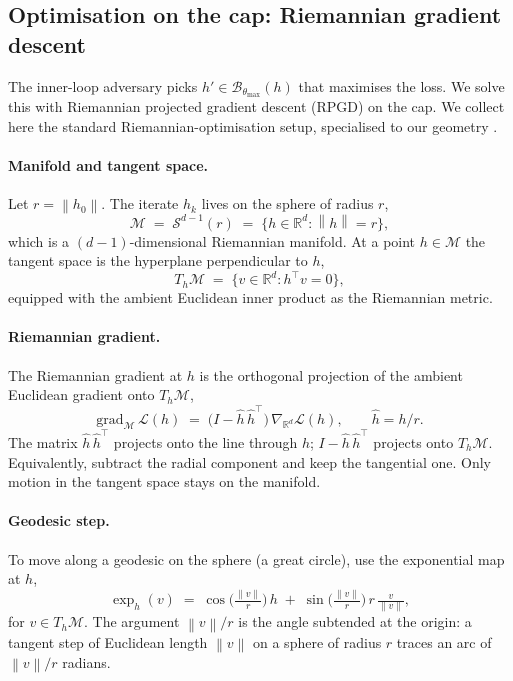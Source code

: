 \documentclass[11pt]{article}
\newcommand{\R}{\mathbb{R}}
\newcommand{\hh}{\hat h}
\newcommand{\thmax}{\theta_{\max}}
\newcommand{\norm}[1]{\left\lVert#1\right\rVert}
\begin{document}
\subsection{Optimisation on the cap: Riemannian gradient descent}\label{sec:projection}

The inner-loop adversary picks $h' \in \mathcal{B}_{\thmax}(h)$ that maximises the loss. We solve this with Riemannian projected gradient descent (RPGD) on the cap. We collect here the standard Riemannian-optimisation setup, specialised to our geometry \citet{bonnabel2013stochastic, tripuraneni2018averaging, boumal2023introduction}.


\paragraph{Manifold and tangent space.} Let $r = \norm{h_0}$. The iterate $h_k$ lives on the sphere of radius $r$,
\begin{equation*}
\mathcal{M} \;=\; \mathcal{S}^{d-1}(r) \;=\; \{ h \in \R^d : \norm{h} = r \},
\end{equation*}
which is a $(d-1)$-dimensional Riemannian manifold. At a point $h \in \mathcal{M}$ the tangent space is the hyperplane perpendicular to $h$,
\begin{equation*}
T_h \mathcal{M} \;=\; \{ v \in \R^d : h^\top v = 0 \},
\end{equation*}
equipped with the ambient Euclidean inner product as the Riemannian metric.

\paragraph{Riemannian gradient.} The Riemannian gradient at $h$ is the orthogonal projection of the ambient Euclidean gradient onto $T_h\mathcal{M}$,
\begin{equation}
\mathrm{grad}_{\mathcal{M}}\, \mathcal{L}(h) \;=\; \big(I - \hh\,\hh^\top\big)\,\nabla_{\R^d}\mathcal{L}(h), \qquad \hh = h/r.
\label{eq:rgrad}
\end{equation}
The matrix $\hh\,\hh^\top$ projects onto the line through $h$; $I - \hh\,\hh^\top$ projects onto $T_h\mathcal{M}$. Equivalently, subtract the radial component and keep the tangential one. Only motion in the tangent space stays on the manifold.

\paragraph{Geodesic step.} To move along a geodesic on the sphere (a great circle), use the exponential map at $h$,
\begin{equation}
\exp_h(v) \;=\; \cos\!\Big(\tfrac{\norm{v}}{r}\Big)\,h \;+\; \sin\!\Big(\tfrac{\norm{v}}{r}\Big)\,r\,\tfrac{v}{\norm{v}},
\label{eq:expmap}
\end{equation}
for $v \in T_h\mathcal{M}$. The argument $\norm{v}/r$ is the angle subtended at the origin: a tangent step of Euclidean length $\norm{v}$ on a sphere of radius $r$ traces an arc of $\norm{v}/r$ radians.
\end{document}

